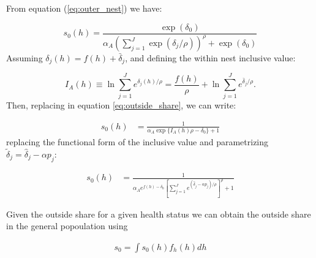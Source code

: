 \documentclass[12pt]{article}
\theoremstyle{plain}
\theoremstyle{plain}
\begin{document}
From equation (\ref{eq:outer_nest}) we have: 

\begin{equation}\label{eq:outside_share}
    s_0(h) = \frac{\exp(\delta_0)}{\alpha_A\left(\sum_{j=1}^J \exp(\delta_j/\rho)\right)^\rho +  \exp \left(\delta_0 \right)}
\end{equation}
Assuming  $\delta_j(h) = f(h) + \bar{\delta}_j$, and defining the within nest inclusive value: 

\[
I_A(h) \equiv \ln \sum_{j=1}^{J} e^{\delta_j(h)/\rho} = \frac{f(h)}{\rho} + \ln \sum_{j=1}^{J} e^{\bar{\delta}_j/\rho}.
\]
Then, replacing in equation \ref{eq:outside_share}, we can write: 


\begin{align}
    s_0(h) %
    &= \frac{1}{\alpha_A\exp\{I_A(h)\rho - \delta_0\} + 1 } 
\end{align}
replacing the functional form of the inclusive value and parametrizing  $\tilde{\delta}_j = \hat{\delta}_j - \alpha p_j$: 

\begin{align}
    s_0(h) %
    &= \frac{1}{\alpha_A e^{f(h) -\delta_0}\left[\sum_{j=1}^{J}e^{(\hat{\delta}_j  - \alpha p_j)/\rho}\right]^\rho + 1 } 
\end{align}


Given the outside share for a given health status we can obtain the outside share in the general popoulation using

\begin{align}
    s_0 = \int s_0(h) f_h(h) dh
\end{align}

 
\end{document}
